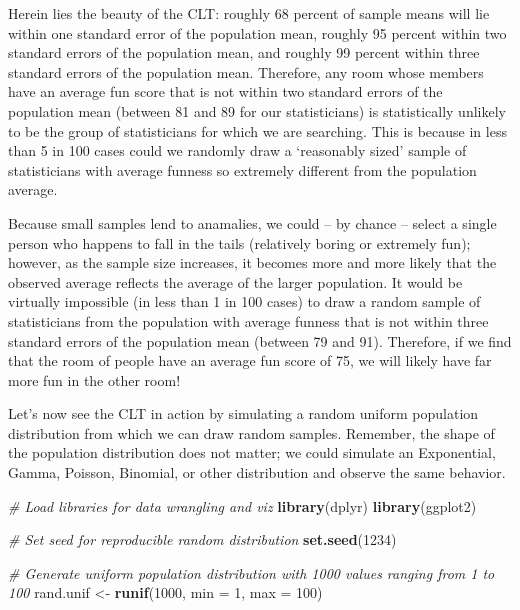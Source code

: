 \documentclass[]{book}
\newenvironment{Shaded}{\begin{snugshade}}{\end{snugshade}}
\newcommand{\CommentTok}[1]{\textcolor[rgb]{0.56,0.35,0.01}{\textit{#1}}}
\newcommand{\DataTypeTok}[1]{\textcolor[rgb]{0.13,0.29,0.53}{#1}}
\newcommand{\DecValTok}[1]{\textcolor[rgb]{0.00,0.00,0.81}{#1}}
\newcommand{\KeywordTok}[1]{\textcolor[rgb]{0.13,0.29,0.53}{\textbf{#1}}}
\newcommand{\NormalTok}[1]{#1}
\newcommand{\StringTok}[1]{\textcolor[rgb]{0.31,0.60,0.02}{#1}}
\begin{document}
Herein lies the beauty of the CLT: roughly 68 percent of sample means will lie within one standard error of the population mean, roughly 95 percent within two standard errors of the population mean, and roughly 99 percent within three standard errors of the population mean. Therefore, any room whose members have an average fun score that is not within two standard errors of the population mean (between 81 and 89 for our statisticians) is statistically unlikely to be the group of statisticians for which we are searching. This is because in less than 5 in 100 cases could we randomly draw a `reasonably sized' sample of statisticians with average funness so extremely different from the population average.

Because small samples lend to anamalies, we could -- by chance -- select a single person who happens to fall in the tails (relatively boring or extremely fun); however, as the sample size increases, it becomes more and more likely that the observed average reflects the average of the larger population. It would be virtually impossible (in less than 1 in 100 cases) to draw a random sample of statisticians from the population with average funness that is not within three standard errors of the population mean (between 79 and 91). Therefore, if we find that the room of people have an average fun score of 75, we will likely have far more fun in the other room!

Let's now see the CLT in action by simulating a random uniform population distribution from which we can draw random samples. Remember, the shape of the population distribution does not matter; we could simulate an Exponential, Gamma, Poisson, Binomial, or other distribution and observe the same behavior.

\begin{Shaded}
\begin{Highlighting}[]
\CommentTok{# Load libraries for data wrangling and viz}
\KeywordTok{library}\NormalTok{(dplyr)}
\KeywordTok{library}\NormalTok{(ggplot2)}

\CommentTok{# Set seed for reproducible random distribution}
\KeywordTok{set.seed}\NormalTok{(}\DecValTok{1234}\NormalTok{)}

\CommentTok{# Generate uniform population distribution with 1000 values ranging from 1 to 100}
\NormalTok{rand.unif <-}\StringTok{ }\KeywordTok{runif}\NormalTok{(}\DecValTok{1000}\NormalTok{, }\DataTypeTok{min =} \DecValTok{1}\NormalTok{, }\DataTypeTok{max =} \DecValTok{100}\NormalTok{)}
\end{Highlighting}
\end{Shaded}
\end{document}
